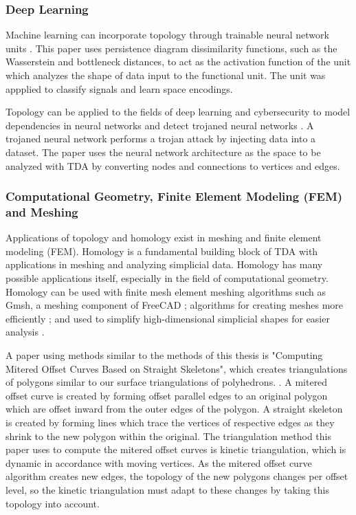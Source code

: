 \documentclass[ma]{uncgdissertationexp}
\theoremstyle{plain}
\theoremstyle{definition}
\theoremstyle{remark}
\begin{document}
\subsubsection{Deep Learning}
\par Machine learning can incorporate topology through trainable neural network units \cite{oballe2021tofu}. This paper uses persistence diagram dissimilarity functions, such as the Wasserstein and bottleneck distances, to act as the activation function of the unit which analyzes the shape of data input to the functional unit. The unit was appplied to classify signals and learn space encodings.
\par Topology can be applied to the fields of deep learning and cybersecurity to model dependencies in neural networks and detect trojaned neural networks \cite{zheng2021topological}. A trojaned neural network performs a trojan attack by injecting data into a dataset. The paper uses the neural network architecture as the space to be analyzed with TDA by converting nodes and connections to vertices and edges.

\subsubsection{Computational Geometry, Finite Element Modeling (FEM) and Meshing}
\par Applications of topology and homology exist in meshing and finite element modeling (FEM). Homology is a fundamental building block of TDA with applications in meshing and analyzing simplicial data. Homology has many possible applications itself, especially in the field of computational geometry. Homology can be used with finite mesh element meshing algorithms such as Gmsh, a meshing component of FreeCAD \cite{homology_fem_computation}; algorithms for creating meshes more efficiently \cite{3d_vol_iso_mesh}; and used to simplify high-dimensional simplicial shapes for easier analysis \cite{efficient_homology_preserving} \cite{mesh_enhanced_persistent}.

\par A paper using methods similar to the methods of this thesis is "Computing Mitered Offset Curves Based on Straight Skeletons", which creates triangulations of polygons similar to our surface triangulations of polyhedrons. \cite{palfrader2015computing}. A mitered offset curve is created by forming offset parallel edges to an original polygon which are offset inward from the outer edges of the polygon. A straight skeleton is created by forming lines which trace the vertices of respective edges as they shrink to the new polygon within the original. The triangulation method this paper uses to compute the mitered offset curves is kinetic triangulation, which is dynamic in accordance with moving vertices. As the mitered offset curve algorithm creates new edges, the topology of the new polygons changes per offset level, so the kinetic triangulation must adapt to these changes by taking this topology into account.
\end{document}
